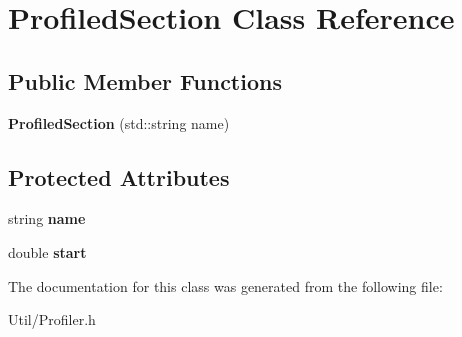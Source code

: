 \hypertarget{class_profiled_section}{\section{\-Profiled\-Section \-Class \-Reference}
\label{class_profiled_section}
}
\subsection*{\-Public \-Member \-Functions}
\begin{DoxyCompactItemize}
\item 
\hypertarget{class_profiled_section_a19f4ad2ae1f348309f0d5169fea83e57}{{\bfseries \-Profiled\-Section} (std\-::string name)}\label{class_profiled_section_a19f4ad2ae1f348309f0d5169fea83e57}

\end{DoxyCompactItemize}
\subsection*{\-Protected \-Attributes}
\begin{DoxyCompactItemize}
\item 
\hypertarget{class_profiled_section_ae02896dd4964d227e3557dd47387580f}{string {\bfseries name}}\label{class_profiled_section_ae02896dd4964d227e3557dd47387580f}

\item 
\hypertarget{class_profiled_section_a36b51e1d06631a8b00ecd587bc236165}{double {\bfseries start}}\label{class_profiled_section_a36b51e1d06631a8b00ecd587bc236165}

\end{DoxyCompactItemize}


\-The documentation for this class was generated from the following file\-:\begin{DoxyCompactItemize}
\item 
\-Util/\-Profiler.\-h\end{DoxyCompactItemize}
